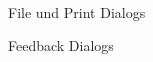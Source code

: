 	 \\
	
	\begin{minipage}{8cm}
		\small{File und Print Dialogs}
	\end{minipage}
	\begin{minipage}{8cm}
		\small{Feedback Dialogs}
	\end{minipage}	
	
